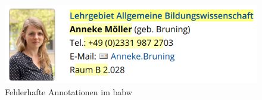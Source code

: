     \begin{figure}[htb]
        \centering
        \includegraphics[scale=\screenshotScaleFactor]{../resources/findings/case-study-1/babw/annotations/missing-annotation.png}
        \caption{Fehlerhafte Annotationen im \gls{babw}}
        \label{image:findingTeachersBaBwWrongAnnotations}
    \end{figure}
